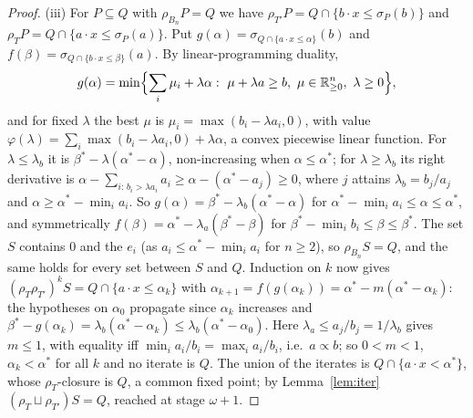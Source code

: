 \documentclass[11pt]{amsart}
\theoremstyle{definition}
\begin{document}
\begin{proof}
(iii) For $P\subseteq Q$ with $\rho_{B_n}P=Q$ we have $\rho_{T'}P=Q\cap
\{b\cdot x\le\sigma_P(b)\}$ and $\rho_TP=Q\cap\{a\cdot x\le\sigma_P(a)\}$.
Put $g(\alpha)=\sigma_{Q\cap\{a\cdot x\le\alpha\}}(b)$ and $f(\beta)=
\sigma_{Q\cap\{b\cdot x\le\beta\}}(a)$. By linear-programming duality,
\[
g(\alpha)=\min\Bigl\{\sum_i\mu_i+\lambda\alpha:\ \mu+\lambda a\ge b,\
\mu\in\mathbb R^n_{\ge0},\ \lambda\ge0\Bigr\},
\]
and for fixed $\lambda$ the best $\mu$ is $\mu_i=\max(b_i-\lambda a_i,0)$,
with value $\varphi(\lambda)=\sum_i\max(b_i-\lambda a_i,0)+\lambda\alpha$,
a convex piecewise linear function. For $\lambda\le\lambda_b$ it is
$\beta^*-\lambda(\alpha^*-\alpha)$, non-increasing when $\alpha\le
\alpha^*$; for $\lambda\ge\lambda_b$ its right derivative is $\alpha-
\sum_{i:\,b_i>\lambda a_i}a_i\ge\alpha-(\alpha^*-a_j)\ge0$, where $j$
attains $\lambda_b=b_j/a_j$ and $\alpha\ge\alpha^*-\min_ia_i$. So
$g(\alpha)=\beta^*-\lambda_b(\alpha^*-\alpha)$ for $\alpha^*-\min_ia_i
\le\alpha\le\alpha^*$, and symmetrically $f(\beta)=\alpha^*-\lambda_a
(\beta^*-\beta)$ for $\beta^*-\min_ib_i\le\beta\le\beta^*$. The set $S$
contains $0$ and the $e_i$ (as $a_i\le\alpha^*-\min_ia_i$ for $n\ge2$),
so $\rho_{B_n}S=Q$, and the same holds for every set between $S$ and
$Q$. Induction on $k$ now gives $(\rho_T\rho_{T'})^kS=Q\cap\{a\cdot x\le
\alpha_k\}$ with $\alpha_{k+1}=f(g(\alpha_k))=\alpha^*-m(\alpha^*-
\alpha_k)$: the hypotheses on $\alpha_0$ propagate since $\alpha_k$
increases and $\beta^*-g(\alpha_k)=\lambda_b(\alpha^*-\alpha_k)\le
\lambda_b(\alpha^*-\alpha_0)$. Here $\lambda_a\le a_j/b_j=1/\lambda_b$
gives $m\le1$, with equality iff $\min_ia_i/b_i=\max_ia_i/b_i$, i.e.\
$a\propto b$; so $0<m<1$, $\alpha_k<\alpha^*$ for all $k$ and no iterate
is $Q$. The union of the iterates is $Q\cap\{a\cdot x<\alpha^*\}$, whose
$\rho_T$-closure is $Q$, a common fixed point; by
Lemma~\ref{lem:iter} $(\rho_T\sqcup\rho_{T'})S=Q$, reached at stage
$\omega+1$.


\end{proof}
\end{document}
